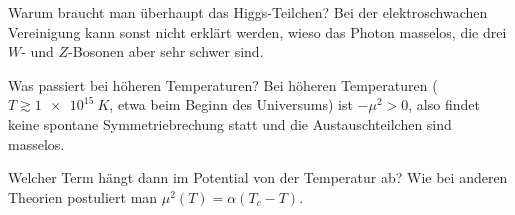 
\begin{fquestion}{Warum braucht man überhaupt das Higgs-Teilchen?}
    Bei der elektroschwachen Vereinigung kann sonst nicht erklärt werden, wieso das Photon masselos, die drei $W$- und $Z$-Bosonen aber sehr schwer sind.
\end{fquestion}



\begin{fquestion}{Was passiert bei höheren Temperaturen?}
    Bei höheren Temperaturen ($T \gtrsim \SI{1e15}{K}$, etwa beim Beginn des Universums) ist $-\mu^2 > 0$, also findet keine spontane Symmetriebrechung statt und die Austauschteilchen sind masselos.
\end{fquestion}

\begin{fquestion}{Welcher Term hängt dann im Potential von der Temperatur ab?}
    Wie bei anderen Theorien postuliert man $\mu^2(T) = \alpha (T_c-T)$.
\end{fquestion}



